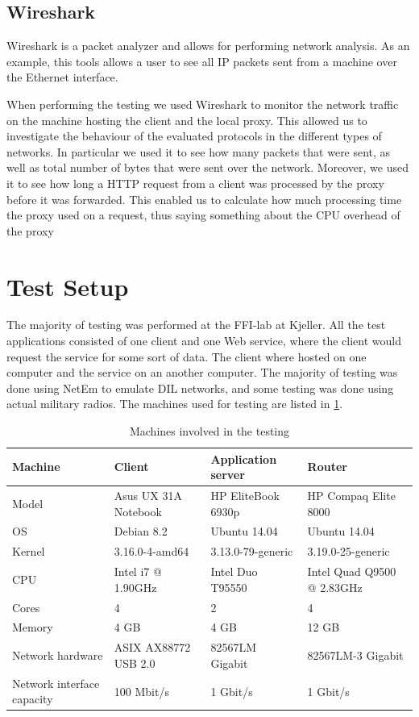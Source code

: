 \subsection{Wireshark}

Wireshark is a packet analyzer and allows for performing network
analysis\cite{wireshark-homepage}. As an example, this tools allows a user to
see all IP packets sent from a machine over the Ethernet interface.

When performing the testing we used Wireshark to monitor the network traffic on
the machine hosting the client and the local proxy. This allowed us to
investigate the behaviour of the evaluated protocols in the different types of
networks. In particular we used it to see how many packets that were sent, as
well as total number of bytes that were sent over the network. Moreover, we used
it to see how long a HTTP request from a client was processed by the proxy
before it was forwarded. This enabled us to calculate how much processing time the
proxy used on a request, thus saying something about the CPU overhead of the proxy

\section{Test Setup}
\label{testing-environment}

The majority of testing was performed at the FFI-lab at Kjeller. All the test
applications consisted of one client and one Web service, where the client would
request the service for some sort of data. The client where hosted on one
computer and the service on an another computer. The majority of testing was
done using NetEm to emulate DIL networks, and some testing was done using actual
military radios. The machines used for testing are listed in
\cref{table-machines}.

\begin{table}[h]
\begin{tabularx}{\textwidth}{| l | X | X | X |}
\hline
  \textbf{Machine} & \textbf{Client} & \textbf{Application server} & \textbf{Router}\\ \hline
  Model & Asus UX 31A Notebook & HP EliteBook 6930p & HP Compaq Elite 8000 \\ \hline
  OS & Debian 8.2 & Ubuntu 14.04 & Ubuntu 14.04\\ \hline
  Kernel & 3.16.0-4-amd64 & 3.13.0-79-generic & 3.19.0-25-generic\\ \hline
  CPU & Intel i7 @ 1.90GHz & Intel Duo T95550 & Intel Quad Q9500 @ 2.83GHz \\ \hline
  Cores & 4 & 2 & 4\\ \hline
  Memory & 4 GB & 4 GB & 12 GB\\ \hline
  Network hardware & ASIX AX88772 USB 2.0 & 82567LM Gigabit & 82567LM-3 Gigabit\\ \hline
  Network interface capacity & 100 Mbit/s & 1 Gbit/s & 1 Gbit/s \\ \hline
\end{tabularx}
\caption{Machines involved in the testing}
\label{table-machines}
\end{table}

